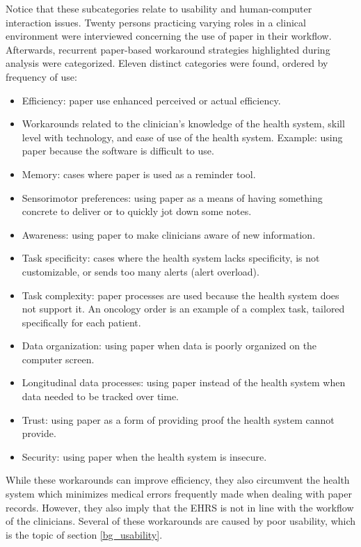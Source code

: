     \noindent Notice that these subcategories relate to usability and human-computer interaction issues. Twenty persons practicing varying roles in a clinical environment were interviewed concerning the use of paper in their workflow. Afterwards, recurrent paper-based workaround strategies highlighted during analysis were categorized. Eleven distinct categories were found, ordered by frequency of use:
    \begin{itemize}
        \item Efficiency: paper use enhanced perceived or actual efficiency.
        \item Workarounds related to the clinician's knowledge of the health system, skill level with technology, and ease of use of the health system. Example: using paper because the software is difficult to use.
        \item Memory: cases where paper is used as a reminder tool.
        \item Sensorimotor preferences: using paper as a means of having something concrete to deliver or to quickly jot down some notes.
        \item Awareness: using paper to make clinicians aware of new information.
        \item Task specificity: cases where the health system lacks specificity, is not customizable, or sends too many alerts (alert overload).
        \item Task complexity: paper processes are used because the health system does not support it. An oncology order is an example of a complex task, tailored specifically for each patient.
        \item Data organization: using paper when data is poorly organized on the computer screen.
        \item Longitudinal data processes: using paper instead of the health system when data needed to be tracked over time.
        \item Trust: using paper as a form of providing proof the health system cannot provide.
        \item Security: using paper when the health system is insecure.
    \end{itemize}

    \noindent While these workarounds can improve efficiency, they also circumvent the health system which minimizes medical errors frequently made when dealing with paper records. However, they also imply that the EHRS is not in line with the workflow of the clinicians. Several of these workarounds are caused by poor usability, which is the topic of section \ref{bg_usability}. %

